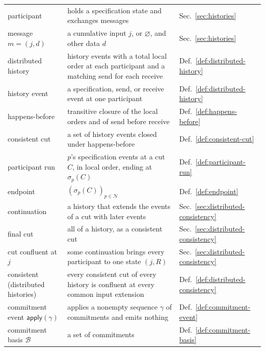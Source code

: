 \documentclass[sigconf]{cidr-2027}
\theoremstyle{remark}
\newcommand{\commitment}{commitment\xspace}
\newcommand{\commitments}{commitments\xspace}
\newcommand{\indesc}{input extension\xspace} %
\begin{document}
{\medskip
\noindent
\begin{tabular}{@{}>{\raggedright\arraybackslash}p{}>{\raggedright\arraybackslash}p{}>{\raggedright\arraybackslash}p{}@{}}
  \toprule
  \multicolumn{3}{@{}l}{\textbf{Distributed execution (\S\ref{sec:distributed-execution})}}\\
  \midrule
  participant & holds a specification state and exchanges messages & Sec.~\ref{sec:histories}\\
  message $m=(j,d)$ & a cumulative input $j$, or $\varnothing$, and other data $d$ & Sec.~\ref{sec:histories}\\
  distributed history & history events with a total local order at each participant and a matching send for each receive & Def.~\ref{def:distributed-history}\\
  history event & a specification, send, or receive event at one participant & Def.~\ref{def:distributed-history}\\
  happens-before & transitive closure of the local orders and of send before receive & Def.~\ref{def:happens-before}\\
  consistent cut & a set of history events closed under happens-before & Def.~\ref{def:consistent-cut}\\
  participant run & $p$'s specification events at a cut $C$, in local order, ending at $\sigma_p(C)$ & Def.~\ref{def:participant-run}\\
  endpoint & $(\sigma_p(C))_{p\in\mathcal N}$ & Def.~\ref{def:endpoint}\\
  continuation & a history that extends the events of a cut with later events & Sec.~\ref{sec:distributed-consistency}\\
  final cut & all of a history, as a consistent cut & Sec.~\ref{sec:distributed-consistency}\\
  cut confluent at $j$ & some continuation brings every participant to one state $(j,R)$ & Sec.~\ref{sec:distributed-consistency}\\
  consistent (distributed histories) & every consistent cut of every history is confluent at every common \indesc & Def.~\ref{def:distributed-consistency}\\
  \commitment event $\mathsf{apply}(\gamma)$ & applies a nonempty sequence $\gamma$ of \commitments and emits nothing & Def.~\ref{def:commitment-event}\\
  \commitment basis $\mathcal B$ & a set of \commitments & Def.~\ref{def:commitment-basis}\\

\end{tabular}}
\end{document}
